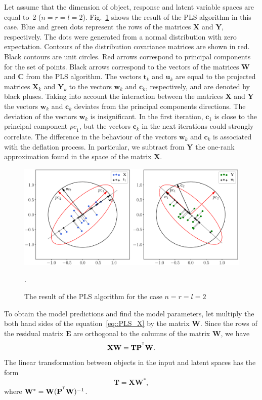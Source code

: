 \documentclass[12pt,twoside]{article}
\newcommand{\bw}{\mathbf{w}}
\newcommand{\bY}{\mathbf{Y}}
\newcommand{\bX}{\mathbf{X}}
\newcommand{\bu}{\mathbf{u}}
\newcommand{\bt}{\mathbf{t}}
\newcommand{\bc}{\mathbf{c}}
\newcommand{\bP}{\mathbf{P}}
\newcommand{\bT}{\mathbf{T}}
\newcommand{\bC}{\mathbf{C}}
\newcommand{\bE}{\mathbf{E}}
\newcommand{\bW}{\mathbf{W}}
\newcommand{\T}{^{\text{\tiny\sffamily\upshape\mdseries T}}}
\begin{document}
Let assume that the dimension of object, response and latent variable spaces are equal to~2 ($n = r = l = 2$).
Fig.~\ref{fig::PLSFigure} shows the result of the PLS algorithm in this case.
Blue and green dots represent the rows of the matrices $\bX$ and $\bY$, respectively. 
The dots were generated from a normal distribution with zero expectation. 
Contours of the distribution covariance matrices are shown in red.
Black contours are unit circles. 
Red arrows correspond to principal components for the set of points. 
Black arrows correspond to the vectors of the matrices $\bW$ and $\bC$ from the PLS algorithm. 
The vectors $\bt_k$ and $\bu_k$ are equal to the projected matrices $\bX_k$ and $\bY_k$ to the vectors $\bw_k$ and $\bc_k$, respectively, and are denoted by black pluses. 
Taking into account the interaction between the matrices $\bX$ and $\bY$ the vectors $\bw_k$ and $\bc_k$ deviates from the principal components directions. 
The deviation of the vectors $\bw_k$ is insignificant. 
In the first iteration, $\bc_1$ is close to the principal component $\textit{pc}_1$, but the vectors $\bc_k$ in the next iterations could strongly correlate. 
The difference in the behaviour of the vectors $\bw_k$ and $\bc_k$ is associated with the deflation process. In particular, we subtract from $\bY$ the one-rank approximation found in the space of the matrix $\bX$.
\begin{figure}[h]
	\centering
	\includegraphics[width=\linewidth]{figs/PLSFigure.eps}
	\caption{The result of the PLS algorithm for the case $n = r = l = 2$}.
	\label{fig::PLSFigure}
\end{figure}

To obtain the model predictions and find the model parameters, let multiply the both hand sides of the equation~\eqref{eq::PLS_X} by the matrix $\bW$. Since the rows of the residual matrix  $\bE$ are orthogonal to the columns of the matrix $\bW$, we have
\[
	\bX \bW = \bT \bP^{\T} \bW.
\]
The linear transformation between objects in the input and latent spaces has the form
\begin{equation}
	\bT = \bX \bW^*,
	\label{eq::W*}
\end{equation}
where $\bW^* = \bW (\bP^{\T} \bW)^{-1}$.
\end{document}
